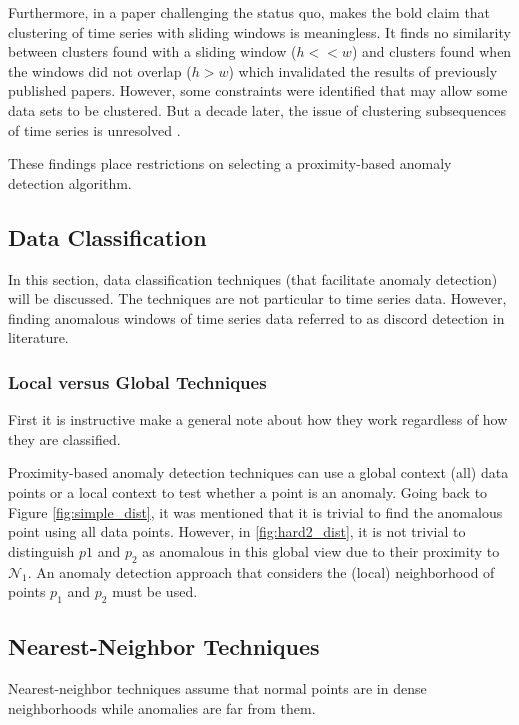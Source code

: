 Furthermore, in a paper challenging the status quo, \cite{Keogh2004} makes the bold claim that clustering of time series with sliding windows is meaningless. It finds no similarity between clusters found with a sliding window ($h<<w$) and clusters found when the windows did not overlap ($h>w$) which invalidated the results of previously published papers. However, some constraints were identified that may allow some data sets to be clustered. But a decade later, the issue of clustering subsequences of time series is unresolved \cite{Zolhavarieh2014}.

These findings place restrictions on selecting a proximity-based anomaly detection algorithm.


\subsection{Data Classification}

In this section, data classification techniques (that facilitate anomaly detection) will be discussed. The techniques are not particular to time series data. However, finding anomalous windows of time series data referred to as discord detection in literature.

\subsubsection{Local versus Global Techniques}

First it is instructive make a general note about how they work regardless of how they are classified.

Proximity-based anomaly detection techniques can use a global context (all) data points or a local context to test whether a point is an anomaly. Going back to Figure \ref{fig:simple_dist}, it was mentioned that it is trivial to find the anomalous point using all data points. However, in \ref{fig:hard2_dist}, it is not trivial to distinguish $p1$ and $p_2$ as anomalous in this global view due to their proximity to $\mathcal{N}_1$. An anomaly detection approach that considers the (local) neighborhood of points $p_1$ and $p_2$ must be used.

\subsection{Nearest-Neighbor Techniques}

Nearest-neighbor techniques assume that normal points are in dense neighborhoods while anomalies are far from them.

